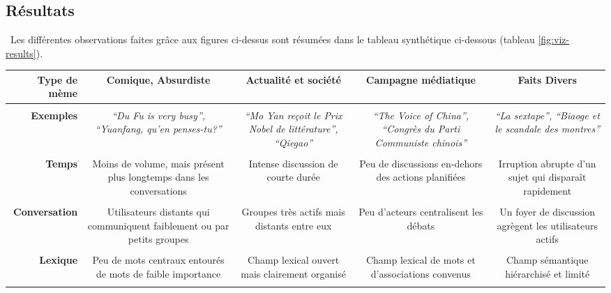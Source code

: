 \subsection[Résumé des résultats]{Résultats}
\
Les différentes observations faites grâce aux figures ci-dessus sont résumées dans le tableau synthétique ci-dessous (tableau \ref{fig:viz-results}).

\begin{table}[h!]
    \begin{tabulary}{\linewidth}{ r | C C C C}

        \textbf{Type de mème} & 
        \textbf{Comique, Absurdiste} &
        \textbf{Actualité et société}  &
        \textbf{Campagne médiatique} &
        \textbf{Faits Divers}  \\
        \hline \\[-1.2ex]

        \textbf{Exemples} & 
        \textit{``Du Fu is very busy'', ``Yuanfang, qu'en penses-tu?''} &
        \textit{``Mo Yan reçoit le Prix Nobel de littérature'', ``Qiegao''} &
        \textit{``The Voice of China'', ``Congrès du Parti Communiste chinois''} &
        \textit{``La sextape'', ``Biaoge et le scandale des montres''} \\
        \hline \\[-1.2ex]

        \textbf{Temps} & 
        Moins de volume, mais présent  plus longtemps dans les conversations &
        Intense discussion de courte durée &
        Peu de discussions en-dehors des actions planifiées &
        Irruption abrupte d'un sujet qui disparaît rapidement \\
        \hline \\[-1.2ex]

        \textbf{Conversation} &  
        Utilisateurs distants qui communiquent faiblement ou par petits groupes &
        Groupes très actifs mais distants entre eux  &
        Peu d{\textquoteright}acteurs centralisent les débats &
        Un foyer de discussion agrègent les utilisateurs actifs \\
        \hline \\[-1.2ex]

        \textbf{Lexique} &
        Peu de mots centraux entourés de mots de faible importance &
        Champ lexical ouvert mais clairement organisé &
        Champ lexical de mots et d'associations convenus  &
        Champ sémantique hiérarchisé et limité \\
        \hline \\[-1.2ex]


\end{tabulary}
\end{table}
